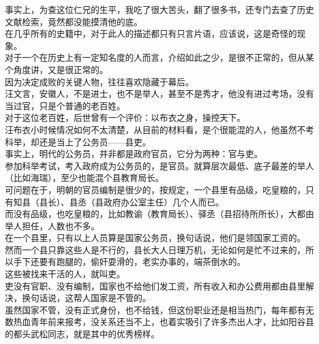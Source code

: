 \begin{multicols}{\theparacolNo}
事实上，为查这位仁兄的生平，我吃了很大苦头，翻了很多书，还专门去查了历史文献检索，竟然都没能摸清他的底。\\

在几乎所有的史籍中，对于此人的描述都只有只言片语，应该说，这是奇怪的现象。\\

对于一个在历史上有一定知名度的人而言，介绍如此之少，是很不正常的，但从某个角度讲，又是很正常的。\\

因为决定成败的关键人物，往往喜欢隐藏于幕后。\\

汪文言，安徽人，不是进士，也不是举人，甚至不是秀才，他没有进过考场，没有当过官，只是个普通的老百姓。\\

对于这位老百姓，后世曾有一个评价：以布衣之身，操控天下。\\

汪布衣小时候情况如何不太清楚，从目前的材料看，是个很能混的人，他虽然不考科举，却还是当上了公务员——县吏。\\

事实上，明代的公务员，并非都是政府官员，它分为两种：官与吏。\\

参加科举考试，考入政府成为公务员的，是官员。就算层次最低、底子最差的举人（比如海瑞），至少也能混个县教育局长。\\

可问题在于，明朝的官员编制是很少的，按规定，一个县里有品级，吃皇粮的，只有知县（县长）、县丞（县政府办公室主任）几个人而已。\\

而没有品级，也吃皇粮的，比如教谕（教育局长）、驿丞（县招待所所长），大都由举人担任，人数也不多。\\

在一个县里，只有以上人员算是国家公务员，换句话说，他们是领国家工资的。\\

然而一个县只靠这些人是不行的，县长大人日理万机，无论如何是忙不过来的，所以手下还要有跑腿的，偷奸耍滑的，老实办事的，端茶倒水的。\\

这些被找来干活的人，就叫吏。\\

吏没有官职、没有编制，国家也不给他们发工资，所有收入和办公费用都由县里解决，换句话说，这帮人国家是不管的。\\

虽然国家不管，没有正式身份，也不给钱，但这份职业还是相当热门，每年都有无数热血青年前来报考，没关系还当不上，也着实吸引了许多杰出人才，比如阳谷县的都头武松同志，就是其中的优秀榜样。\\


\end{multicols}
